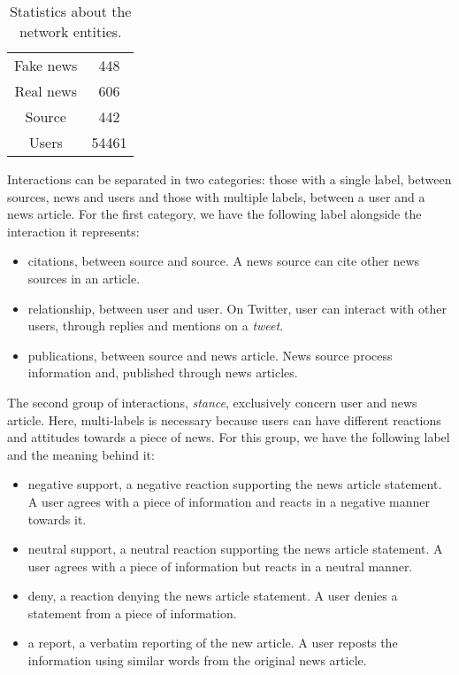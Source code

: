 \begin{table}[h]
    \centering
    \caption{Statistics about the network entities.}
    \label{tab:dataset:entities}
    \begin{tabular}{cc}
        \toprule
        Fake news & 448\\
        Real news & 606\\
        Source & 442\\
        Users & 54461\\
        \bottomrule
    \end{tabular}
\end{table}

Interactions can be separated in two categories: those with a single label, between sources, news and users and those with multiple labels, between a user and a news article.
For the first category, we have the following label alongside the interaction it represents:
\begin{itemize}
    \item citations, between source and source.
        A news source can cite other news sources in an article.
    \item relationship, between user and user.
        On Twitter, user can interact with other users, through replies and mentions on a \textit{tweet}.
    \item publications, between source and news article. News source process information and, published through news articles.
\end{itemize}

The second group of interactions, \textit{stance}, exclusively concern user and news article.
Here, multi-labels is necessary because users can have different reactions and attitudes towards a piece of news.
For this group, we have the following label and the meaning behind it:
\begin{itemize}
    \item negative support, a negative reaction supporting the news article statement.
        A user agrees with a piece of information and reacts in a negative manner towards it. 
    \item neutral support, a neutral reaction supporting the news article statement.
        A user agrees with a piece of information but reacts in a neutral manner.
    \item deny, a reaction denying the news article statement.
        A user denies a statement from a piece of information.
    \item a report, a verbatim reporting of the new article.
        A user reposts the information using similar words from the original news article.
\end{itemize}


